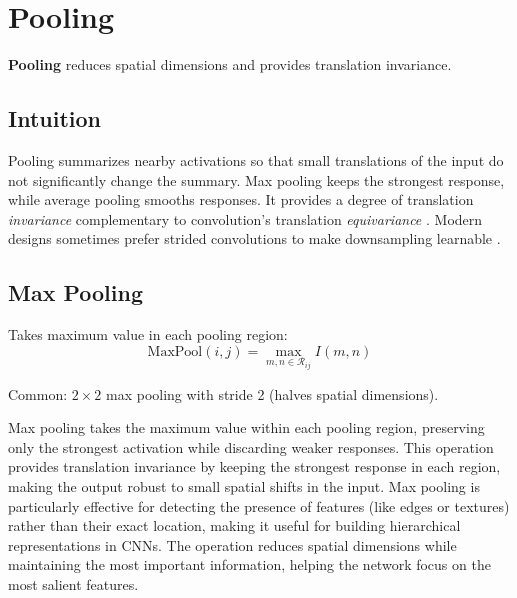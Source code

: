 
\section{Pooling}
\label{sec:pooling}


\textbf{Pooling} reduces spatial dimensions and provides translation invariance.

\subsection*{Intuition}
Pooling summarizes nearby activations so that small translations of the input do not significantly change the summary. Max pooling keeps the strongest response, while average pooling smooths responses. It provides a degree of translation \emph{invariance} complementary to convolution's translation \emph{equivariance} . Modern designs sometimes prefer strided convolutions to make downsampling learnable \cite{GoodfellowEtAl2016,He2016}.

\subsection{Max Pooling}

Takes maximum value in each pooling region:
\begin{equation}
\text{MaxPool}(i,j) = \max_{m,n \in \mathcal{R}_{ij}} I(m,n)
\end{equation}

Common: $2 \times 2$ max pooling with stride 2 (halves spatial dimensions).

Max pooling takes the maximum value within each pooling region, preserving only the strongest activation while discarding weaker responses. This operation provides translation invariance by keeping the strongest response in each region, making the output robust to small spatial shifts in the input. Max pooling is particularly effective for detecting the presence of features (like edges or textures) rather than their exact location, making it useful for building hierarchical representations in CNNs. The operation reduces spatial dimensions while maintaining the most important information, helping the network focus on the most salient features.

